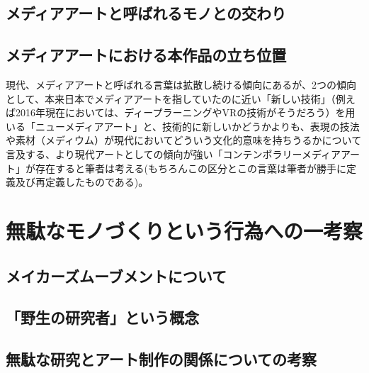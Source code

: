 \section{メディアアートと呼ばれるモノとの交わり}\label{ux30e1ux30c7ux30a3ux30a2ux30a2ux30fcux30c8ux3068ux547cux3070ux308cux308bux30e2ux30ceux3068ux306eux4ea4ux308fux308a}

\section{メディアアートにおける本作品の立ち位置}\label{ux30e1ux30c7ux30a3ux30a2ux30a2ux30fcux30c8ux306bux304aux3051ux308bux672cux4f5cux54c1ux306eux7acbux3061ux4f4dux7f6e}

現代、メディアアートと呼ばれる言葉は拡散し続ける傾向にあるが、2つの傾向として、本来日本でメディアアートを指していたのに近い「新しい技術」（例えば2016年現在においては、ディープラーニングやVRの技術がそうだろう）を用いる「ニューメディアアート」と、技術的に新しいかどうかよりも、表現の技法や素材（メディウム）が現代においてどういう文化的意味を持ちうるかについて言及する、より現代アートとしての傾向が強い「コンテンポラリーメディアアート」が存在すると筆者は考える(もちろんこの区分とこの言葉は筆者が勝手に定義及び再定義したものである)。

\chapter{無駄なモノづくりという行為への一考察}\label{ux7121ux99c4ux306aux30e2ux30ceux3065ux304fux308aux3068ux3044ux3046ux884cux70baux3078ux306eux4e00ux8003ux5bdf}

\section{メイカーズムーブメントについて}\label{ux30e1ux30a4ux30abux30fcux30baux30e0ux30fcux30d6ux30e1ux30f3ux30c8ux306bux3064ux3044ux3066}

\section{「野生の研究者」という概念}\label{ux91ceux751fux306eux7814ux7a76ux8005ux3068ux3044ux3046ux6982ux5ff5}

\section{無駄な研究とアート制作の関係についての考察}\label{ux7121ux99c4ux306aux7814ux7a76ux3068ux30a2ux30fcux30c8ux5236ux4f5cux306eux95a2ux4fc2ux306bux3064ux3044ux3066ux306eux8003ux5bdf}

